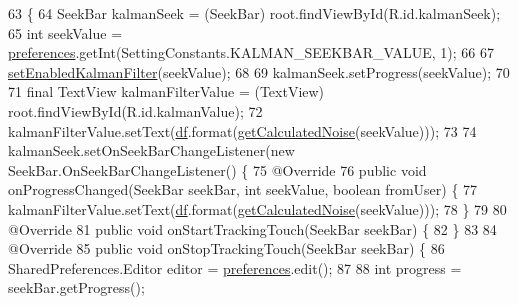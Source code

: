 \begin{DoxyCode}
63                                                    \{
64         SeekBar kalmanSeek = (SeekBar) root.findViewById(R.id.kalmanSeek);
65         \textcolor{keywordtype}{int} seekValue = \hyperlink{classit_1_1unibo_1_1torsello_1_1bluetoothpositioning_1_1fragment_1_1SettingsFragment_a52480c4d5d81ca59fe4a98ae3c623ea4_a52480c4d5d81ca59fe4a98ae3c623ea4}{preferences}.getInt(SettingConstants.KALMAN\_SEEKBAR\_VALUE, 1);
66 
67         \hyperlink{classit_1_1unibo_1_1torsello_1_1bluetoothpositioning_1_1fragment_1_1SettingsFragment_ae16c093ba7bc137acf21dfc221cdcf56_ae16c093ba7bc137acf21dfc221cdcf56}{setEnabledKalmanFilter}(seekValue);
68 
69         kalmanSeek.setProgress(seekValue);
70 
71         \textcolor{keyword}{final} TextView kalmanFilterValue = (TextView) root.findViewById(R.id.kalmanValue);
72         kalmanFilterValue.setText(\hyperlink{classit_1_1unibo_1_1torsello_1_1bluetoothpositioning_1_1fragment_1_1SettingsFragment_af6b80a700dc80c39a56d001b68a47694_af6b80a700dc80c39a56d001b68a47694}{df}.format(\hyperlink{classit_1_1unibo_1_1torsello_1_1bluetoothpositioning_1_1fragment_1_1SettingsFragment_a595d859602f34ca81957a0578c1602a6_a595d859602f34ca81957a0578c1602a6}{getCalculatedNoise}(seekValue)));
73 
74         kalmanSeek.setOnSeekBarChangeListener(\textcolor{keyword}{new} SeekBar.OnSeekBarChangeListener() \{
75             @Override
76             \textcolor{keyword}{public} \textcolor{keywordtype}{void} onProgressChanged(SeekBar seekBar, \textcolor{keywordtype}{int} seekValue, \textcolor{keywordtype}{boolean} fromUser) \{
77                 kalmanFilterValue.setText(\hyperlink{classit_1_1unibo_1_1torsello_1_1bluetoothpositioning_1_1fragment_1_1SettingsFragment_af6b80a700dc80c39a56d001b68a47694_af6b80a700dc80c39a56d001b68a47694}{df}.format(\hyperlink{classit_1_1unibo_1_1torsello_1_1bluetoothpositioning_1_1fragment_1_1SettingsFragment_a595d859602f34ca81957a0578c1602a6_a595d859602f34ca81957a0578c1602a6}{getCalculatedNoise}(seekValue)));
78             \}
79 
80             @Override
81             \textcolor{keyword}{public} \textcolor{keywordtype}{void} onStartTrackingTouch(SeekBar seekBar) \{
82             \}
83 
84             @Override
85             \textcolor{keyword}{public} \textcolor{keywordtype}{void} onStopTrackingTouch(SeekBar seekBar) \{
86                 SharedPreferences.Editor editor = \hyperlink{classit_1_1unibo_1_1torsello_1_1bluetoothpositioning_1_1fragment_1_1SettingsFragment_a52480c4d5d81ca59fe4a98ae3c623ea4_a52480c4d5d81ca59fe4a98ae3c623ea4}{preferences}.edit();
87 
88                 \textcolor{keywordtype}{int} progress = seekBar.getProgress();

\end{DoxyCode}
